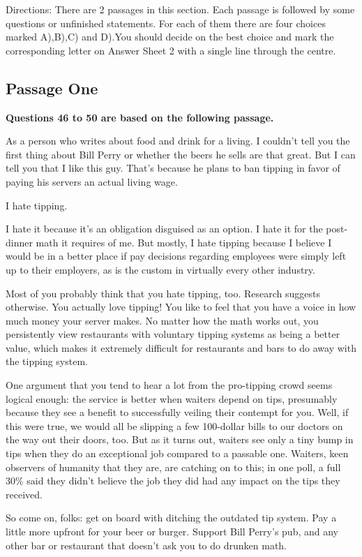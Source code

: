 \documentclass[UTF8,11pt]{ctexart}
\begin{document}
Directions: There are 2 passages in this section. Each passage is followed by some questions or unfinished statements. For each of them there are four choices marked A),B),C) and D).You should decide on the best choice and mark the corresponding letter on Answer Sheet 2 with a single line through the centre.


\subsection*{\textbf{Passage One}}


\textbf{Questions 46 to 50 are based on the following passage.}


As a person who writes about food and drink for a living. I couldn't tell you the first thing about Bill Perry or whether the beers he sells are that great. But I can tell you that I like this guy. That's because he plans to ban tipping in favor of paying his servers an actual living wage.


I hate tipping.


I hate it because it's an obligation disguised as an option. I hate it for the post-dinner math it requires of me. But mostly, I hate tipping because I believe I would be in a better place if pay decisions regarding employees were simply left up to their employers, as is the custom in virtually every other industry.


Most of you probably think that you hate tipping, too. Research suggests otherwise. You actually love tipping! You like to feel that you have a voice in how much money your server makes. No matter how the math works out, you persistently view restaurants with voluntary tipping systems as being a better value, which makes it extremely difficult for restaurants and bars to do away with the tipping system.


One argument that you tend to hear a lot from the pro-tipping crowd seems logical enough: the service is better when waiters depend on tips, presumably because they see a benefit to successfully veiling their contempt for you. Well, if this were true, we would all be slipping a few 100-dollar bills to our doctors on the way out their doors, too. But as it turns out, waiters see only a tiny bump in tips when they do an exceptional job compared to a passable one. Waiters, keen observers of humanity that they are, are catching on to this; in one poll, a full 30\% said they didn't believe the job they did had any impact on the tips they received.


So come on, folks: get on board with ditching the outdated tip system. Pay a little more upfront for your beer or burger. Support Bill Perry's pub, and any other bar or restaurant that doesn't ask you to do drunken math.
\end{document}
